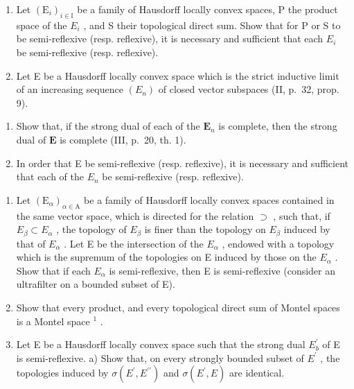 \begin{enumerate}
\def\labelenumi{\arabic{enumi})}
\setcounter{enumi}{6}
\item
  Let \((\mathrm{E}_{i})_{i\in\mathbb{I}}\) be a family of Hausdorff locally convex spaces, P the product space of the \(E_{i}\) , and S their topological direct sum. Show that for P or S to be semi-reflexive (resp. reflexive), it is necessary and sufficient that each \(E_{i}\) be semi-reflexive (resp. reflexive).
\item
  Let E be a Hausdorff locally convex space which is the strict inductive limit of an increasing sequence \((E_{n})\) of closed vector subspaces (II, p.~32, prop. 9).
\end{enumerate}

\begin{enumerate}
\def\labelenumi{\alph{enumi})}
\item
  Show that, if the strong dual of each of the \(\mathbf{E}_n\) is complete, then the strong dual of \(\mathbf{E}\) is complete (III, p.~20, th. 1).
\item
  In order that E be semi-reflexive (resp. reflexive), it is necessary and sufficient that each of the \(E_{n}\) be semi-reflexive (resp. reflexive).
\end{enumerate}

\begin{enumerate}
\def\labelenumi{\arabic{enumi})}
\setcounter{enumi}{8}
\item
  Let \((\mathrm{E}_{\alpha})_{\alpha\in\mathrm{A}}\) be a family of Hausdorff locally convex spaces contained in the same vector space, which is directed for the relation \(\supset\) , such that, if \(E_{\beta} \subset E_{\alpha}\) , the topology of \(E_{\beta}\) is finer than the topology on \(E_{\beta}\) induced by that of \(E_{\alpha}\) . Let E be the intersection of the \(E_{\alpha}\) , endowed with a topology which is the supremum of the topologies on E induced by those on the \(E_{\alpha}\) . Show that if each \(E_{\alpha}\) is semi-reflexive, then E is semi-reflexive (consider an ultrafilter on a bounded subset of E).
\item
  Show that every product, and every topological direct sum of Montel spaces is a Montel space \(^{1}\) .
\item
  Let E be a Hausdorff locally convex space such that the strong dual \(E_{b}^{\prime}\) of E is semi-reflexive. a) Show that, on every strongly bounded subset of \(E^{\prime}\) , the topologies induced by \(\sigma(E^{\prime}, E^{\prime\prime})\) and \(\sigma(E^{\prime}, E)\) are identical.
\end{enumerate}

